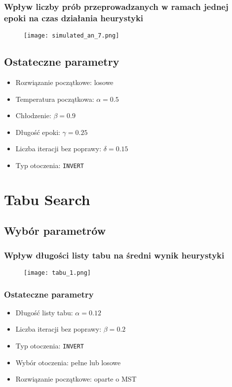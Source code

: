 \documentclass{article}
\begin{document}
\newpage

\subsubsection{Wpływ liczby prób przeprowadzanych w ramach jednej epoki na czas działania heurystyki}
    \begin{figure}[h!]
        \centering
        \texttt{[image: simulated\_an\_7.png]}
    \end{figure}

\subsection{Ostateczne parametry}
\begin{itemize}
    \item Rozwiązanie początkowe: losowe
    \item Temperatura początkowa: $\alpha = 0.5$
    \item Chłodzenie: $\beta = 0.9$
    \item Długość epoki: $\gamma = 0.25$
    \item Liczba iteracji bez poprawy: $\delta = 0.15$
    \item Typ otoczenia: \texttt{INVERT}
\end{itemize}

\section{Tabu Search}
\subsection{Wybór parametrów}

\subsubsection{Wpływ długości listy tabu na średni wynik heurystyki}
    \begin{figure}[h!]
        \centering
        \texttt{[image: tabu\_1.png]}
    \end{figure}

\subsubsection{Ostateczne parametry}
\begin{itemize}
    \item Długość listy tabu: $\alpha = 0.12$
    \item Liczba iteracji bez poprawy: $\beta = 0.2$
    \item Typ otoczenia: \texttt{INVERT}
    \item Wybór otoczenia: pełne lub losowe
    \item Rozwiązanie początkowe: oparte o MST
\end{itemize}
    
\end{document}
